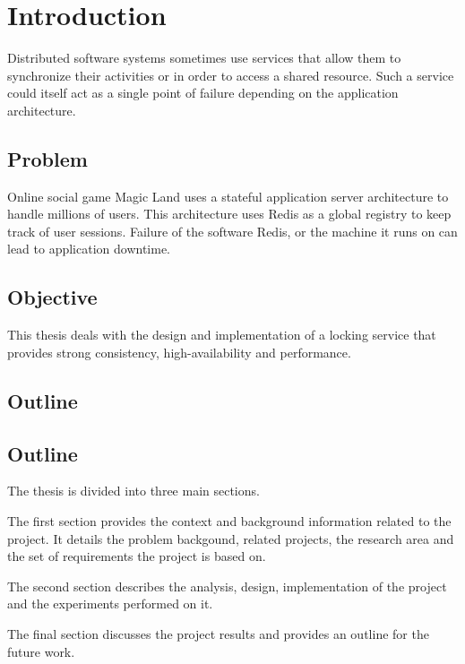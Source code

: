\chapter{Introduction}
\label{chapter:introduction}

Distributed software systems sometimes use services that allow them to 
synchronize their activities or in order to access a shared resource. Such a
service could itself act as a single point of failure depending on the
application architecture.

\section{Problem}

Online social game Magic Land uses a stateful application server architecture to
handle millions of users. This architecture uses Redis as a global registry to
keep track of user sessions. Failure of the software Redis, or the machine it
runs on can lead to application downtime.

\section{Objective}

This thesis deals with the design and implementation of a locking service that
provides strong consistency, high-availability and performance.

\section{Outline}


\section{Outline}
The thesis is divided into three main sections.

The first section provides the context and background information related to the
project. It details the problem backgound, related projects, the research
area and the set of requirements the project is based on.

The second section describes the analysis, design, implementation of the project
and the experiments performed on it.

The final section discusses the project results and provides an outline for
the future work.

